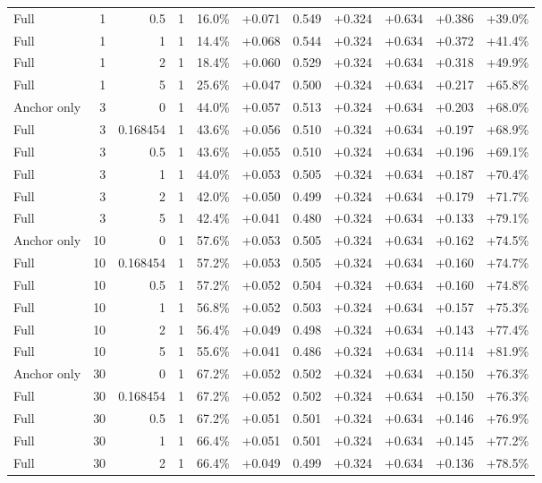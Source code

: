 \begin{table}[htbp]
\begin{tabular}{lrrrccccccc}
Full & 1 & 0.5 & 1 & 16.0\% & +0.071 & 0.549 & +0.324 & +0.634 & +0.386 & +39.0\% \\
Full & 1 & 1 & 1 & 14.4\% & +0.068 & 0.544 & +0.324 & +0.634 & +0.372 & +41.4\% \\
Full & 1 & 2 & 1 & 18.4\% & +0.060 & 0.529 & +0.324 & +0.634 & +0.318 & +49.9\% \\
Full & 1 & 5 & 1 & 25.6\% & +0.047 & 0.500 & +0.324 & +0.634 & +0.217 & +65.8\% \\
Anchor only & 3 & 0 & 1 & 44.0\% & +0.057 & 0.513 & +0.324 & +0.634 & +0.203 & +68.0\% \\
Full & 3 & 0.168454 & 1 & 43.6\% & +0.056 & 0.510 & +0.324 & +0.634 & +0.197 & +68.9\% \\
Full & 3 & 0.5 & 1 & 43.6\% & +0.055 & 0.510 & +0.324 & +0.634 & +0.196 & +69.1\% \\
Full & 3 & 1 & 1 & 44.0\% & +0.053 & 0.505 & +0.324 & +0.634 & +0.187 & +70.4\% \\
Full & 3 & 2 & 1 & 42.0\% & +0.050 & 0.499 & +0.324 & +0.634 & +0.179 & +71.7\% \\
Full & 3 & 5 & 1 & 42.4\% & +0.041 & 0.480 & +0.324 & +0.634 & +0.133 & +79.1\% \\
Anchor only & 10 & 0 & 1 & 57.6\% & +0.053 & 0.505 & +0.324 & +0.634 & +0.162 & +74.5\% \\
Full & 10 & 0.168454 & 1 & 57.2\% & +0.053 & 0.505 & +0.324 & +0.634 & +0.160 & +74.7\% \\
Full & 10 & 0.5 & 1 & 57.2\% & +0.052 & 0.504 & +0.324 & +0.634 & +0.160 & +74.8\% \\
Full & 10 & 1 & 1 & 56.8\% & +0.052 & 0.503 & +0.324 & +0.634 & +0.157 & +75.3\% \\
Full & 10 & 2 & 1 & 56.4\% & +0.049 & 0.498 & +0.324 & +0.634 & +0.143 & +77.4\% \\
Full & 10 & 5 & 1 & 55.6\% & +0.041 & 0.486 & +0.324 & +0.634 & +0.114 & +81.9\% \\
Anchor only & 30 & 0 & 1 & 67.2\% & +0.052 & 0.502 & +0.324 & +0.634 & +0.150 & +76.3\% \\
Full & 30 & 0.168454 & 1 & 67.2\% & +0.052 & 0.502 & +0.324 & +0.634 & +0.150 & +76.3\% \\
Full & 30 & 0.5 & 1 & 67.2\% & +0.051 & 0.501 & +0.324 & +0.634 & +0.146 & +76.9\% \\
Full & 30 & 1 & 1 & 66.4\% & +0.051 & 0.501 & +0.324 & +0.634 & +0.145 & +77.2\% \\
Full & 30 & 2 & 1 & 66.4\% & +0.049 & 0.499 & +0.324 & +0.634 & +0.136 & +78.5\% \\

\end{tabular}
\end{table}
